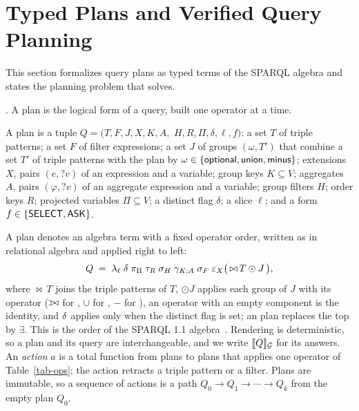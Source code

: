 \section{Typed Plans and Verified Query Planning}
\label{sec-problem}

This section formalizes query plans as typed terms of the SPARQL
algebra and states the planning problem that \hermes solves.

.
A plan is the logical form of a query, built one operator at a time.

\begin{definition}[Plan]
\label{def-plan}
A plan is a tuple $Q = (T, F, J, X, K, A,$ $H, R, \Pi, \delta, \ell, f)$:
a set $T$ of triple patterns;
a set $F$ of filter expressions;
a set $J$ of groups $(\omega, T')$ that combine a set $T'$ of triple
patterns with the plan by
$\omega \in \{{\mathsf{optional}}, {\mathsf{union}}, {\mathsf{minus}}\}$;
extensions $X$, pairs $(e, ?v)$ of an expression and a variable;
group keys $K \subseteq V$;
aggregates $A$, pairs $(\varphi, ?v)$ of an aggregate expression and a
variable;
group filters $H$;
order keys $R$;
projected variables $\Pi \subseteq V$;
a distinct flag $\delta$;
a slice $\ell$;
and a form $f \in \{{\mathsf{SELECT}}, {\mathsf{ASK}}\}$.
\end{definition}

A plan denotes an algebra term with a fixed operator order, written as
in relational algebra and applied right to left:
\begin{equation}
\label{eq-plan}
Q \;=\; \lambda_\ell\; \delta\; \pi_\Pi\; \tau_R\; \sigma_H\;
\gamma_{K;A}\; \sigma_F\; \varepsilon_X \bigl(\,{\bowtie}\,T \odot J\,\bigr),
\end{equation}
where ${\bowtie}\,T$ joins the triple patterns of $T$, $\odot J$ applies
each group of $J$ with its operator ($\ljoin$ for , $\cup$
for , $-$ for ), an operator with an empty component
is the identity, and $\delta$ applies only when the distinct flag is
set; an  plan replaces the top by $\exists$.
This is the order of the SPARQL 1.1 algebra~\cite{sparql11}.
Rendering is deterministic, so a plan and its query are interchangeable,
and we write $[\![ Q ]\!]_{\mathcal{G}}$ for its answers.
An \emph{action} $a$ is a total function from plans to plans that
applies one operator of Table~\ref{tab-ops}; the action 
retracts a triple pattern or a filter.
Plans are immutable, so a sequence of actions is a path
$Q_0 \to Q_1 \to \cdots \to Q_k$ from the empty plan $Q_0$.

